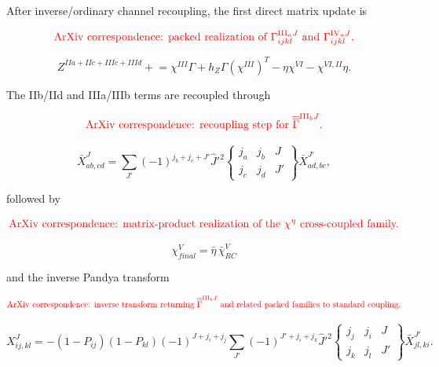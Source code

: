 \documentclass[
]{article}
\begin{document}
After inverse/ordinary channel recoupling, the first direct matrix
update is

\begin{equation}
{\color{red}\text{ArXiv correspondence: packed realization of }\Gamma^{\mathrm{III}_aJ}_{ijkl}\text{ and }\Gamma^{\mathrm{IV}_aJ}_{ijkl}.}
\end{equation}

\begin{equation}
Z^{IIa+IIc+IIIc+IIId}
\mathrel{+}=
\chi^{III}\Gamma+h_Z\Gamma(\chi^{III})^T
-\eta\chi^{VI}-\chi^{VI,II}\eta .
\end{equation}

The IIb/IId and IIIa/IIIb terms are recoupled through

\begin{equation}
{\color{red}\text{ArXiv correspondence: recoupling step for }\overline{\overline\Gamma}^{\mathrm{III}_bJ}.}
\end{equation}

\begin{equation}
\bar X^{J}_{ab,cd}
=\sum_{J'}(-1)^{j_b+j_c+J'}\hat J'^2
\begin{Bmatrix} j_a&j_b&J\\ j_c&j_d&J'\end{Bmatrix}
\bar X^{J'}_{ad,bc},
\end{equation}

followed by

\begin{equation}
{\color{red}\text{ArXiv correspondence: matrix-product realization of the }\chi^{\eta}\text{ cross-coupled family.}}
\end{equation}

\begin{equation}
\chi^V_{final}=\bar\eta\,\bar\chi^V_{RC}
\end{equation}

and the inverse Pandya transform

\begin{equation}
{\color{red}\text{ArXiv correspondence: inverse transform returning }\overline{\overline\Gamma}^{\mathrm{III}_bJ}\text{ and related packed families to standard coupling.}}
\end{equation}

\begin{equation}
X^J_{ij,kl}=-(1-P_{ij})(1-P_{kl})(-1)^{J+j_i+j_j}
\sum_{J'}(-1)^{J'+j_i+j_k}\hat J'^2
\begin{Bmatrix} j_j&j_i&J\\ j_k&j_l&J'\end{Bmatrix}
\bar X^{J'}_{jl,ki} .
\end{equation}
\end{document}
